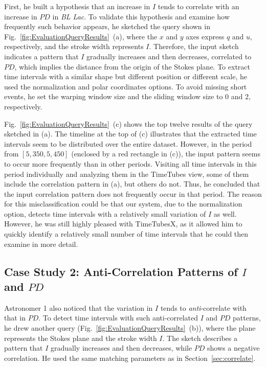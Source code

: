 First, he built a hypothesis that an increase in $I$ tends to correlate with an increase in $PD$ in \emph{BL Lac}.
To validate this hypothesis and examine how frequently such behavior appears, he sketched the query shown in Fig.~\ref{fig:EvaluationQueryResults}~(a), 
where the $x$ and $y$ axes express $q$ and $u$, respectively, 
and the stroke width represents $I$.
Therefore, the input sketch indicates a pattern 
that $I$ gradually increases and then decreases, correlated to $PD$, which implies the distance from the origin of the Stokes plane.
To extract time intervals with a similar shape but different position or different scale, he used the normalization and polar coordinates options. 
To avoid missing short events, he set the warping window size and the sliding window size to 0 and 2, respectively.

Fig.~\ref{fig:EvaluationQueryResults}~(c) shows the top twelve results of the query sketched in (a).
The timeline at the top of (c) illustrates 
that the extracted time intervals seem to be distributed over the entire dataset.
However, in the period from $[5{,}350, 5{,}450]$ (enclosed by a red rectangle in (c)), 
the input pattern seems to occur more frequently than in other periods.
Visiting all time intervals in this period individually and analyzing them in the TimeTubes view,
some of them include the correlation pattern in (a),
but others do not.
Thus, he concluded that the input correlation pattern does not frequently occur in that period.
The reason for this misclassification could be that our system, due to the normalization option, detects time intervals with a relatively small variation of $I$ as well.
However, he was still highly pleased with TimeTubesX, as it allowed him to quickly identify a relatively small number of time intervals that he could then examine in more detail.

%
\subsection{Case Study 2: Anti-Correlation Patterns of $I$ and $PD$}\label{sec:anticorrelate}
Astronomer 1 also noticed that the variation in $I$ tends to \emph{anti}-correlate with that in $PD$. %
To detect time intervals with such anti-correlated $I$ and $PD$ patterns, he drew another query (Fig.~\ref{fig:EvaluationQueryResults}~(b)),
where the plane represents the Stokes plane and the stroke width $I$.
The sketch describes a pattern that $I$ gradually increases and then decreases, while $PD$ shows a negative correlation. %
He used the same matching parameters as in Section~\ref{sec:correlate}.

